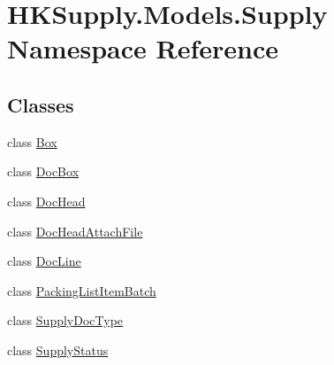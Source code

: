 \hypertarget{namespace_h_k_supply_1_1_models_1_1_supply}{}\section{H\+K\+Supply.\+Models.\+Supply Namespace Reference}
\label{namespace_h_k_supply_1_1_models_1_1_supply}
\subsection*{Classes}
\begin{DoxyCompactItemize}
\item 
class \mbox{\hyperlink{class_h_k_supply_1_1_models_1_1_supply_1_1_box}{Box}}
\item 
class \mbox{\hyperlink{class_h_k_supply_1_1_models_1_1_supply_1_1_doc_box}{Doc\+Box}}
\item 
class \mbox{\hyperlink{class_h_k_supply_1_1_models_1_1_supply_1_1_doc_head}{Doc\+Head}}
\item 
class \mbox{\hyperlink{class_h_k_supply_1_1_models_1_1_supply_1_1_doc_head_attach_file}{Doc\+Head\+Attach\+File}}
\item 
class \mbox{\hyperlink{class_h_k_supply_1_1_models_1_1_supply_1_1_doc_line}{Doc\+Line}}
\item 
class \mbox{\hyperlink{class_h_k_supply_1_1_models_1_1_supply_1_1_packing_list_item_batch}{Packing\+List\+Item\+Batch}}
\item 
class \mbox{\hyperlink{class_h_k_supply_1_1_models_1_1_supply_1_1_supply_doc_type}{Supply\+Doc\+Type}}
\item 
class \mbox{\hyperlink{class_h_k_supply_1_1_models_1_1_supply_1_1_supply_status}{Supply\+Status}}
\end{DoxyCompactItemize}

